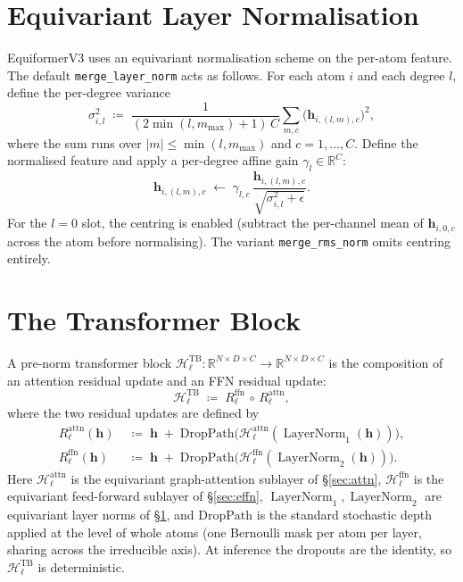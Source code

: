 \documentclass[11pt,a4paper]{article}
\DeclareMathOperator{\LN}{LayerNorm}
\newcommand{\R}{\mathbb{R}}
\newcommand{\bh}{\bm{h}}
\newcommand{\mmax}{m_{\max}}
\newcommand{\Hb}{\mathcal{H}}
\theoremstyle{plain}
\theoremstyle{definition}
\theoremstyle{remark}
\begin{document}
\section{Equivariant Layer Normalisation}\label{sec:eqLN}

EquiformerV3 uses an equivariant normalisation scheme on the per-atom feature.
The default \texttt{merge\_layer\_norm} acts as follows. For each atom $i$ and
each degree $l$, define the per-degree variance
\begin{equation}\label{eq:eqLN-var}
    \sigma_{i,l}^2\;\coloneqq\;\frac{1}{(2\min(l,\mmax)+1)\,C}\sum_{m,c}\bigl(\bh_{i,(l,m),c}\bigr)^2,
\end{equation}
where the sum runs over $|m|\le\min(l,\mmax)$ and $c=1,\dots,C$.
Define the normalised feature and apply a per-degree affine gain $\gamma_l\in\R^C$:
\begin{equation}\label{eq:eqLN-norm}
    \bh_{i,(l,m),c}\;\leftarrow\;\gamma_{l,c}\,\frac{\bh_{i,(l,m),c}}{\sqrt{\sigma_{i,l}^2+\epsilon}}.
\end{equation}
For the $l=0$ slot, the centring is enabled (subtract the per-channel mean of $\bh_{i,0,c}$ across the atom before normalising).
The variant \texttt{merge\_rms\_norm} omits centring entirely.

\section{The Transformer Block}\label{sec:block}

A pre-norm transformer block $\Hb^{\mathrm{TB}}_\ell:\R^{N\times D\times
        C}\to\R^{N\times D\times C}$ is the composition of an attention residual update
and an FFN residual update:
\begin{equation}\label{eq:tb-block}
    \Hb^{\mathrm{TB}}_\ell\;\coloneqq\;R^{\mathrm{ffn}}_\ell\,\circ\,R^{\mathrm{attn}}_\ell,
\end{equation}
where the two residual updates are defined by
\begin{align}
    R^{\mathrm{attn}}_\ell(\bh)\; & \coloneqq\;\bh\;+\;\mathrm{DropPath}\bigl(\Hb^{\mathrm{attn}}_\ell(\LN_1(\bh))\bigr),\label{eq:tb-1} \\
    R^{\mathrm{ffn}}_\ell(\bh)\;  & \coloneqq\;\bh\;+\;\mathrm{DropPath}\bigl(\Hb^{\mathrm{ffn}}_\ell(\LN_2(\bh))\bigr).\label{eq:tb-2}
\end{align}
Here $\Hb^{\mathrm{attn}}_\ell$ is the equivariant graph-attention sublayer of \S\ref{sec:attn}, $\Hb^{\mathrm{ffn}}_\ell$ is the equivariant feed-forward sublayer of \S\ref{sec:effn}, $\LN_1,\LN_2$ are equivariant layer norms of \S\ref{sec:eqLN}, and $\mathrm{DropPath}$ is the standard stochastic depth applied at the level of whole atoms (one Bernoulli mask per atom per layer, sharing across the irreducible axis).
At inference the dropouts are the identity, so $\Hb^{\mathrm{TB}}_\ell$ is deterministic.
\end{document}
